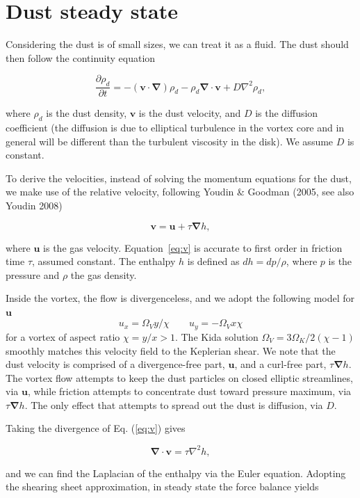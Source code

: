 \documentclass[apj]{emulateapj}
\newcommand{\pderiv}[2]{\frac{\partial #1}{\partial #2}}
\renewcommand{\v}[1]{{\boldsymbol{#1}}} %
\newcommand{\del}{\v{\nabla}}
\newcommand{\grad}{\del}
\newcommand{\Div}{\del\cdot}
\newcommand{\Laplace}{\nabla^2}
\newcommand{\Eq}[1]{Eq. (\ref{#1})}
\newcommand{\eq}[1]{\Eq{#1}}
\newcommand{\beq}{\begin{equation}}
\newcommand{\eeq}{\end{equation}}
\begin{document}
\section{Dust steady state} 
\label{sect:model-equations}

Considering the dust is of small sizes, we can treat it as a
fluid. The dust should then follow the continuity equation 

\beq
  \pderiv{\rho_d}{t} = -(\v{v}\cdot\del)\rho_d - \rho_d \Div{\v{v}} + D\Laplace{\rho_d},
  \label{eq:continuity}
\eeq

\noindent where $\rho_d$ is the dust density, $\v{v}$ is the dust
velocity, and $D$ is the diffusion coefficient (the diffusion is due
to elliptical turbulence in the vortex core and in general will be
different than the turbulent viscosity in the disk). We assume $D$ is
constant. 

To derive the velocities, instead of solving the momentum equations
for the dust, we make use of the relative velocity, following Youdin \& Goodman (2005,
see also Youdin 2008)  

\beq
\v{v} = \v{u} + \tau  \grad{h}, 
\label{eq:v}
\eeq

\noindent where $\v{u}$ is the gas velocity. Equation~\ref{eq:v} is 
accurate to first order in friction time $\tau$, assumed 
constant. The enthalpy $h$ is defined as $dh = dp /\rho$, where $p$ 
is the pressure and $\rho$ the gas density. 

Inside the vortex, the flow is divergenceless, and 
we adopt the following model for $\v{u}$
\beq
  u_x = \varOmega_V y / \chi \qquad  u_y= -\varOmega_V x \chi
  \label{eq:vortex}
\eeq
\noindent for a vortex of aspect ratio $\chi= y/x > 1$. The Kida
solution $\varOmega_V = 3\Omega_K/2(\chi-1)$ smoothly matches 
this velocity field to the Keplerian shear. We note that the dust
velocity is comprised of a divergence-free part, $\v{u}$, and a
curl-free part, $\tau\grad{h}$. The vortex flow attempts to keep the
dust particles on closed elliptic streamlines, via $\v{u}$, while friction
attempts to concentrate dust toward pressure maximum, via $\tau\grad
h$. The only effect that attempts to spread out the dust is diffusion, via $D$.  

Taking the divergence of
\eq{eq:v} gives 

\beq
\Div{\v{v}} = \tau \Laplace{h}, 
\label{eq:divv}
\eeq

\noindent and we can find the Laplacian of the enthalpy via the Euler
equation. Adopting the shearing sheet approximation, in steady state
the force balance yields  
\end{document}
